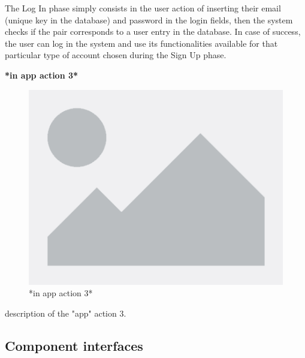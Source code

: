 \documentclass[table, 12pt]{article}
\begin{document}
The Log In phase simply consists in the user action of inserting their email (unique key in the database) and password in the login fields, then the system checks if the pair corresponds to a user entry in the database.
In case of success, the user can log in the system and use its functionalities available for that particular type of account chosen during the Sign Up phase.

\newpage


\textbf{*in app action 3*}
\begin{center}
    \begin{figure}[H]
        \includegraphics[scale=0.70, center]{assets/placeholder.png}
        \caption{*in app action 3*}
        \label{fig: *in app action 3*}
    \end{figure}
\end{center}
description of the "app" action 3.

\newpage


\subsection{Component interfaces}
\end{document}
